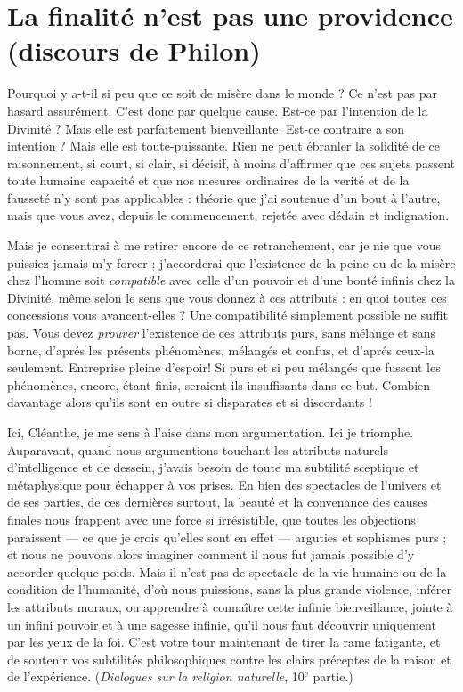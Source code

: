 
\section{La finalité n'est pas une providence (discours de Philon)}

Pourquoi y a-t-il si peu que ce soit de misère dans le
monde ? Ce n’est pas par hasard assurément. C’est donc
par quelque cause. Est-ce par l’intention de la Divinité ?
Mais elle est parfaitement bienveillante. Est-ce contraire
a son intention ? Mais elle est toute-puissante. Rien ne
peut ébranler la solidité de ce raisonnement, si court,
si clair, si décisif, à moins d’affirmer que ces sujets passent
toute humaine capacité et que nos mesures ordinaires
de la verité et de la fausseté n’y sont pas applicables :
théorie que j’ai soutenue d’un bout à l'autre, mais que
vous avez, depuis le commencement, rejetée avec dédain
et indignation.

Mais je consentirai à me retirer encore de ce retranchement,
car je nie que vous puissiez jamais m’y forcer ;
j’accorderai que l’existence de la peine ou de la misère
chez l'homme soit {\it compatible} avec celle d’un pouvoir et
d'une bonté infinis chez la Divinité, même selon le sens
que vous donnez à ces attributs : en quoi toutes ces concessions
vous avancent-elles ? Une compatibilité simplement
possible ne suffit pas. Vous devez {\it prouver} l’existence de
ces attributs purs, sans mélange et sans borne, d’aprés
les présents phénomènes, mélangés et confus, et d’aprés
ceux-la seulement. Entreprise pleine d’espoir! Si purs
et si peu mélangés que fussent les phénomènes, encore, étant
finis, seraient-ils insuffisants dans ce but. Combien davantage
alors qu’ils sont en outre si disparates et si discordants !

Ici, Cléanthe, je me sens à l’aise dans mon argumentation.
Ici je triomphe. Auparavant, quand nous argumentions
touchant les attributs naturels d’intelligence
et de dessein, j’avais besoin de toute ma subtilité sceptique
et métaphysique pour échapper à vos prises. En bien des
spectacles de l’univers et de ses parties, de ces dernières
surtout, la beauté et la convenance des causes finales
nous frappent avec une force si irrésistible, que toutes les
objections paraissent — ce que je crois qu’elles sont en
effet — arguties et sophismes purs ; et nous ne pouvons
alors imaginer comment il nous fut jamais possible d’y
accorder quelque poids. Mais il n’est pas de spectacle de
la vie humaine ou de la condition de l’humanité, d’où
nous puissions, sans la plus grande violence, inférer les
attributs moraux, ou apprendre à connaître cette infinie
bienveillance, jointe à un infini pouvoir et à une sagesse
infinie, qu’il nous faut découvrir uniquement par les
yeux de la foi. C’est votre tour maintenant de tirer la
rame fatigante, et de soutenir vos subtilités philosophiques
contre les clairs préceptes de la raison et de l’expérience.
({\it Dialogues sur la religion naturelle}, 10$^\text{e}$ partie.)

